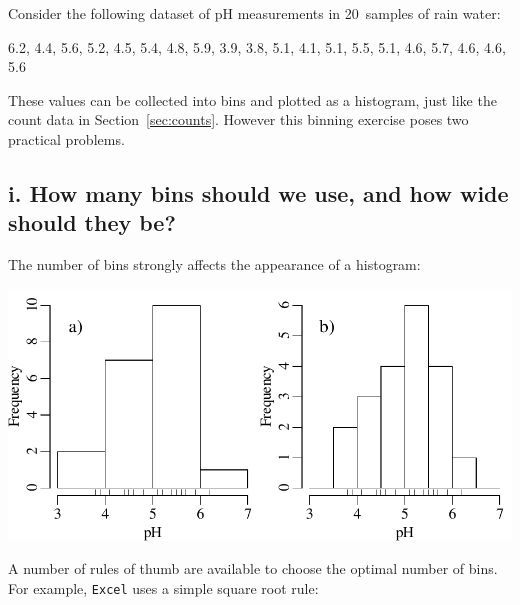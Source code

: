 Consider the following dataset of pH measurements in 20~samples of
rain water:

\begin{center}
6.2, 4.4, 5.6, 5.2, 4.5, 5.4, 4.8, 5.9, 3.9, 3.8, 5.1, 4.1, 5.1, 5.5,
5.1, 4.6, 5.7, 4.6, 4.6, 5.6
\end{center}

These values can be collected into bins and plotted as a histogram,
just like the count data in Section~\ref{sec:counts}. However this
binning exercise poses two practical problems.

\subsection*{i. How many bins should we use, and how wide should they be?}

The number of bins strongly affects the appearance of a histogram:

\noindent\begin{minipage}[t][][b]{.5\textwidth}
  \includegraphics[width=\textwidth]{../figures/binwidth.pdf}\medskip
\end{minipage}
\begin{minipage}[t][][t]{.5\textwidth}
  \label{fig:binwidth}
\end{minipage}

A number of rules of thumb are available to choose the optimal number
of bins. For example, \texttt{Excel} uses a simple square root rule:

